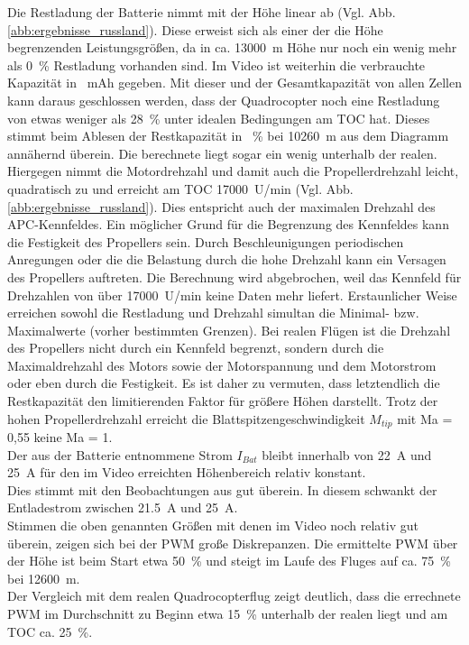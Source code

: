 Die Restladung der Batterie nimmt mit der Höhe linear ab (Vgl. Abb.\ref{abb:ergebnisse_russland}). Diese erweist sich als einer der die Höhe begrenzenden Leistungsgrößen, da in ca. \SI{13000}{m} Höhe nur noch ein wenig mehr als \SI{0}{\%} Restladung vorhanden sind. Im Video ist weiterhin die verbrauchte Kapazität in \SI{}{mAh} gegeben. Mit dieser und der Gesamtkapazität von allen Zellen kann daraus geschlossen werden, dass der Quadrocopter noch eine Restladung von etwas weniger als \SI{28}{\%} unter idealen Bedingungen am TOC hat. Dieses stimmt beim Ablesen der Restkapazität in \SI{}{\%} bei \SI{10260}{m} aus dem Diagramm annähernd überein. Die berechnete liegt sogar ein wenig unterhalb der realen. \\
Hiergegen nimmt die Motordrehzahl und damit auch die Propellerdrehzahl leicht, quadratisch zu und erreicht am TOC \SI{17000}{U/min} (Vgl. Abb.\ref{abb:ergebnisse_russland}).  
Dies entspricht auch der maximalen Drehzahl des APC-Kennfeldes. Ein möglicher Grund für die Begrenzung des Kennfeldes kann die Festigkeit des Propellers sein. Durch Beschleunigungen periodischen Anregungen oder die die Belastung durch die hohe Drehzahl kann ein Versagen des Propellers auftreten. Die Berechnung wird abgebrochen, weil das Kennfeld für Drehzahlen von über \SI{17000}{U/min} keine Daten mehr liefert. Erstaunlicher Weise erreichen sowohl die Restladung und Drehzahl simultan die Minimal- bzw. Maximalwerte (vorher bestimmten Grenzen). Bei realen Flügen ist die Drehzahl des Propellers nicht durch ein Kennfeld begrenzt, sondern durch die Maximaldrehzahl des Motors sowie der Motorspannung und dem Motorstrom oder eben durch die Festigkeit. Es ist daher zu vermuten, dass letztendlich die Restkapazität den limitierenden Faktor für größere Höhen darstellt. Trotz der hohen Propellerdrehzahl erreicht die Blattspitzengeschwindigkeit \ensuremath{M_{tip}} mit Ma = 0,55 keine Ma = 1. \\
Der aus der Batterie entnommene Strom \ensuremath{I_{Bat}} bleibt innerhalb von \SI{22}{A} und \SI{25}{A} für den im Video erreichten Höhenbereich relativ konstant. \\
Dies stimmt mit den Beobachtungen aus \cite{Anderson.2018} gut überein. In diesem schwankt der Entladestrom zwischen \SI{21,5}{A} und \SI{25}{A}. \\
Stimmen die oben genannten Größen mit denen im Video noch relativ gut überein, zeigen sich bei der PWM große Diskrepanzen. Die ermittelte PWM über der Höhe ist beim Start etwa \SI{50}{\%} und steigt im Laufe des Fluges auf ca. \SI{75}{\%} bei \SI{12600}{m}. \\
Der Vergleich mit dem realen Quadrocopterflug zeigt deutlich, dass die errechnete PWM im Durchschnitt zu Beginn etwa \SI{15}{\%} unterhalb der realen liegt und am TOC ca. \SI{25}{\%}.


